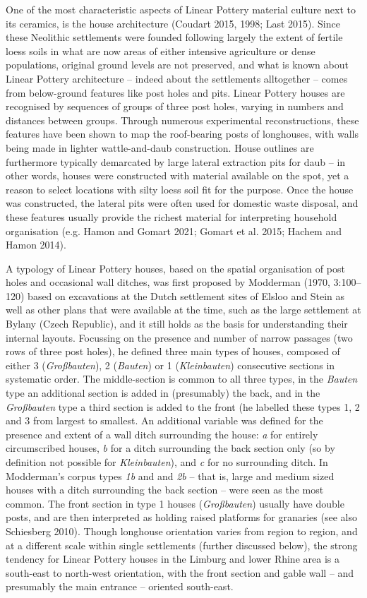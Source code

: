 \documentclass[
  12pt,
  a4paper, twoside]{book}
\begin{document}
One of the most characteristic aspects of Linear Pottery material culture next to its ceramics, is the house architecture (Coudart 2015, 1998; Last 2015). Since these Neolithic settlements were founded following largely the extent of fertile loess soils in what are now areas of either intensive agriculture or dense populations, original ground levels are not preserved, and what is known about Linear Pottery architecture -- indeed about the settlements alltogether -- comes from below-ground features like post holes and pits. Linear Pottery houses are recognised by sequences of groups of three post holes, varying in numbers and distances between groups. Through numerous experimental reconstructions, these features have been shown to map the roof-bearing posts of longhouses, with walls being made in lighter wattle-and-daub construction. House outlines are furthermore typically demarcated by large lateral extraction pits for daub -- in other words, houses were constructed with material available on the spot, yet a reason to select locations with silty loess soil fit for the purpose. Once the house was constructed, the lateral pits were often used for domestic waste disposal, and these features usually provide the richest material for interpreting household organisation (e.g. Hamon and Gomart 2021; Gomart et al. 2015; Hachem and Hamon 2014).

A typology of Linear Pottery houses, based on the spatial organisation of post holes and occasional wall ditches, was first proposed by Modderman (1970, 3:100--120) based on excavations at the Dutch settlement sites of Elsloo and Stein as well as other plans that were available at the time, such as the large settlement at Bylany (Czech Republic), and it still holds as the basis for understanding their internal layouts. Focussing on the presence and number of narrow passages (two rows of three post holes), he defined three main types of houses, composed of either 3 (\emph{Großbauten}), 2 (\emph{Bauten}) or 1 (\emph{Kleinbauten}) consecutive sections in systematic order. The middle-section is common to all three types, in the \emph{Bauten} type an additional section is added in (presumably) the back, and in the \emph{Großbauten} type a third section is added to the front (he labelled these types 1, 2 and 3 from largest to smallest. An additional variable was defined for the presence and extent of a wall ditch surrounding the house: \emph{a} for entirely circumscribed houses, \emph{b} for a ditch surrounding the back section only (so by definition not possible for \emph{Kleinbauten}), and \emph{c} for no surrounding ditch. In Modderman's corpus types \emph{1b} and and \emph{2b} -- that is, large and medium sized houses with a ditch surrounding the back section -- were seen as the most common. The front section in type 1 houses (\emph{Großbauten}) usually have double posts, and are then interpreted as holding raised platforms for granaries (see also Schiesberg 2010). Though longhouse orientation varies from region to region, and at a different scale within single settlements (further discussed below), the strong tendency for Linear Pottery houses in the Limburg and lower Rhine area is a south-east to north-west orientation, with the front section and gable wall -- and presumably the main entrance -- oriented south-east.
\end{document}
